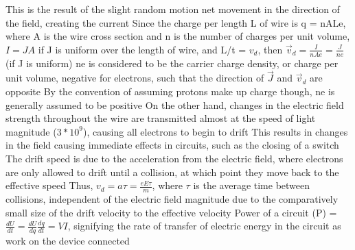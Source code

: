 \documentclass[11 pt, twoside]{article}
\newenvironment{outline*}
{
	\begin{outline}[enumerate]
	}
	{\end{outline}
}
\begin{document}
\begin{outline*}
\2 This is the result of the slight random motion net movement in the direction of the field, creating the current
\2 Since the charge per length L of wire is q = nALe, where A is the wire cross section and n is the number of charges per unit volume, $I = JA$ if J is uniform over the length of wire, and L/t = $v_d$, then $\vec{v}_d = \frac{I}{nAe} = \frac{J}{ne}$ (if J is uniform)
\3 ne is considered to be the carrier charge density, or charge per unit volume, negative for electrons, such that the direction of $\vec{J}$ and $\vec{v}_d$ are opposite
\3 By the convention of assuming protons make up charge though, ne is generally assumed to be positive
\2 On the other hand, changes in the electric field strength throughout the wire are transmitted almost at the speed of light magnitude ($3*10^9$), causing all electrons to begin to drift
\3 This results in changes in the field causing immediate effects in circuits, such as the closing of a switch
\2 The drift speed is due to the acceleration from the electric field, where electrons are only allowed to drift until a collision, at which point they move back to the effective speed
\3 Thus, $v_d = a\tau = \frac{eE\tau}{m}$, where $\tau$ is the average time between collisions, independent of the electric field magnitude due to the comparatively small size of the drift velocity to the effective velocity
\1 Power of a circuit (P) = $\frac{dU}{dt} = \frac{dU}{dq}\frac{dq}{dt} = VI$, signifying the rate of transfer of electric energy in the circuit as work on the device connected
\end{outline*}
\end{document}
